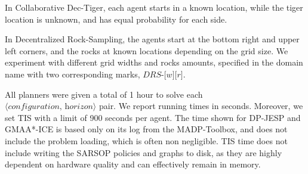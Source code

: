 \documentclass[runningheads]{llncs}
\newcommand{\eliran}[1]{\textbf{[\color{red}ELIRAN:#1]}}
\newcommand{\cdt}[0]{Collaborative Dec-Tiger}
\newcommand{\drs}[0]{Decentralized Rock-Sampling}
\begin{document}
{{In \cdt, each agent starts in a known location, while the tiger location is unknown, and has equal probability for each side.

In \drs, the agents start at the bottom right and upper left corners, and the rocks at known locations depending on the grid size. We experiment with different grid widths and rocks amounts, specified in the domain name with two corresponding marks, $\textit{DRS-[w][r]}$.
}

All planners were given a total of 1 hour to solve each\\ $\langle\textit{configuration, horizon}\rangle$ pair. We report running times in seconds. Moreover, we set TIS with a limit of 900 seconds per agent. The time shown for DP-JESP and GMAA*-ICE is based only on its log from the MADP-Toolbox, and does not include the problem loading, which is often non negligible. TIS time does not include writing the SARSOP policies and graphs to disk, as they are highly dependent on hardware quality and can effectively remain in memory. %



}
\end{document}
